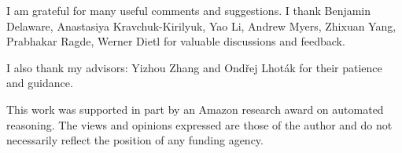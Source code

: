 \vspace*{\fill}

\newpage


\vspace*{\fill}


\vspace*{\fill}


\newpage


\vspace*{\fill}

I am grateful for many useful comments and suggestions.  I thank
Benjamin Delaware,
Anastasiya Kravchuk-Kirilyuk, Yao Li, Andrew Myers, Zhixuan Yang, Prabhakar Ragde, Werner Dietl
for valuable discussions and feedback. 

I also thank my advisors: Yizhou Zhang and Ondřej Lhoták for their patience and guidance.


This work was supported in part by an Amazon research award on automated
reasoning.
The views and opinions expressed are those of the author and do not necessarily
reflect the position of any funding agency.

\vspace*{\fill}

\newpage
\renewcommand{\contentsname}{Table of Contents}
\tableofcontents

\newpage 

\vspace*{\fill}

\listoffigures


\vspace*{\fill} 

\newpage 

\vspace*{\fill}



\vspace*{\fill} 






\vspace*{\fill} 